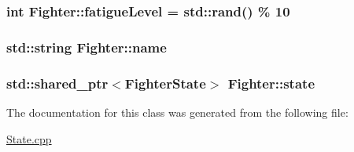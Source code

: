 \subsubsection[{\texorpdfstring{fatigue\+Level}{fatigueLevel}}]{\setlength{\rightskip}{0pt plus 5cm}int Fighter\+::fatigue\+Level = std\+::rand() \% 10\hspace{0.3cm}{\ttfamily [private]}}\hypertarget{classFighter_aa54661200c35e46a969c4efd97e84784}{}\label{classFighter_aa54661200c35e46a969c4efd97e84784}
\subsubsection[{\texorpdfstring{name}{name}}]{\setlength{\rightskip}{0pt plus 5cm}std\+::string Fighter\+::name\hspace{0.3cm}{\ttfamily [private]}}\hypertarget{classFighter_a1b57178f9d5293da5f9d3d28cab097dc}{}\label{classFighter_a1b57178f9d5293da5f9d3d28cab097dc}
\subsubsection[{\texorpdfstring{state}{state}}]{\setlength{\rightskip}{0pt plus 5cm}std\+::shared\+\_\+ptr$<${\bf Fighter\+State}$>$ Fighter\+::state\hspace{0.3cm}{\ttfamily [private]}}\hypertarget{classFighter_a3221c5b17cd0e0ffcb4333bbd3fca734}{}\label{classFighter_a3221c5b17cd0e0ffcb4333bbd3fca734}


The documentation for this class was generated from the following file\+:\begin{DoxyCompactItemize}
\item 
\hyperlink{State_8cpp}{State.\+cpp}\end{DoxyCompactItemize}
